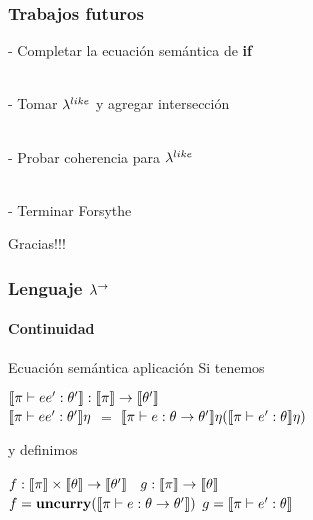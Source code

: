 \documentclass{beamer}
\begin{document}
\begin{frame}
\frametitle{Trabajos futuros}

\begin{block}{}

- Completar la ecuación semántica de \textbf{if}\\
\

- Tomar $\lambda^{like}$ y agregar intersección\\
\

- Probar coherencia para $\lambda^{like}$\\
\

- Terminar Forsythe\\

\end{block}

\end{frame}

\begin{frame}
\begin{center}\Huge
Gracias!!!
\end{center}
\end{frame}


\begin{frame}
\frametitle{Lenguaje $\lambda^{\rightarrow}$}
\framesubtitle{Continuidad}

\begin{block}{Ecuación semántica aplicación}
Si tenemos

\begin{center}
$\llbracket \pi \vdash ee' : \theta' \rrbracket : \llbracket \pi \rrbracket \rightarrow \llbracket \theta' \rrbracket$\\
$\llbracket \pi \vdash ee' : \theta' \rrbracket\eta$ $=$ $\llbracket \pi \vdash e : \theta \rightarrow \theta' \rrbracket\eta (\llbracket \pi \vdash e' : \theta \rrbracket\eta)$
\end{center}

y definimos

\begin{center}
$f : \llbracket \pi \rrbracket \times \llbracket \theta \rrbracket \rightarrow \llbracket \theta' \rrbracket$
\quad \quad \quad \quad \quad \
$g : \llbracket \pi \rrbracket \rightarrow \llbracket \theta \rrbracket$\\
$f = \textbf{uncurry} (\llbracket \pi \vdash e : \theta \rightarrow \theta' \rrbracket)$
\quad
$g = \llbracket \pi \vdash e' : \theta \rrbracket$
\end{center}

\end{block}

\end{frame}
\end{document}
